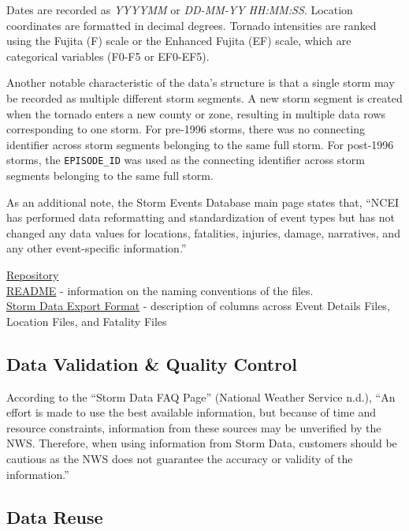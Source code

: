 \documentclass[
  letterpaper,
  DIV=11,
  numbers=noendperiod]{scrreprt}
\begin{document}
Dates are recorded as \emph{YYYYMM} or \emph{DD-MM-YY HH:MM:SS}.
Location coordinates are formatted in decimal degrees. Tornado
intensities are ranked using the Fujita (F) scale or the Enhanced Fujita
(EF) scale, which are categorical variables (F0-F5 or EF0-EF5).

Another notable characteristic of the data's structure is that a single
storm may be recorded as multiple different storm segments. A new storm
segment is created when the tornado enters a new county or zone,
resulting in multiple data rows corresponding to one storm. For pre-1996
storms, there was no connecting identifier across storm segments
belonging to the same full storm. For post-1996 storms, the
\texttt{EPISODE\_ID} was used as the connecting identifier across storm
segments belonging to the same full storm.

As an additional note, the Storm Events Database main page states that,
``NCEI has performed data reformatting and standardization of event
types but has not changed any data values for locations, fatalities,
injuries, damage, narratives, and any other event-specific
information.''

\href{https://www.ncei.noaa.gov/pub/data/swdi/stormevents/csvfiles/}{Repository}\\
\href{https://www.ncei.noaa.gov/pub/data/swdi/stormevents/csvfiles/README}{README}
- information on the naming conventions of the files.\\
\href{https://www.ncei.noaa.gov/pub/data/swdi/stormevents/csvfiles/Storm-Data-Export-Format.pdf}{Storm
Data Export Format} - description of columns across Event Details Files,
Location Files, and Fatality Files

\subsection{Data Validation \& Quality
Control}\label{data-validation-quality-control}

According to the ``Storm Data FAQ Page'' (National Weather Service
n.d.), ``An effort is made to use the best available information, but
because of time and resource constraints, information from these sources
may be unverified by the NWS. Therefore, when using information from
Storm Data, customers should be cautious as the NWS does not guarantee
the accuracy or validity of the information.''

\subsection{Data Reuse}\label{data-reuse}
\end{document}
